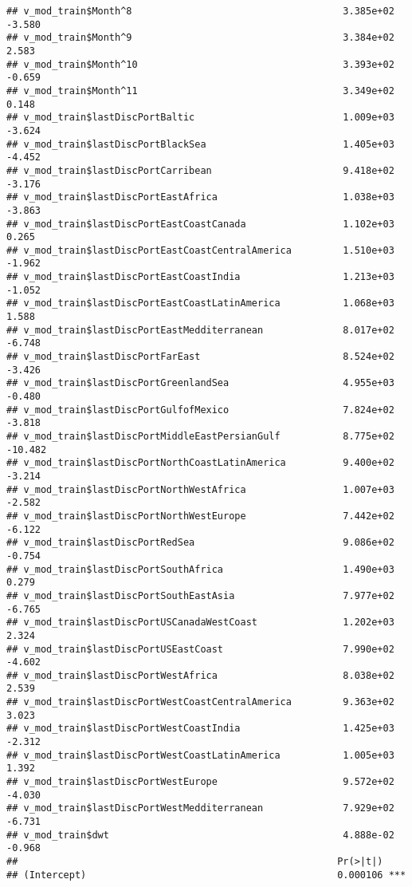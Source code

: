 \documentclass[]{article}
\begin{document}
\begin{verbatim}
## v_mod_train$Month^8                                     3.385e+02  -3.580
## v_mod_train$Month^9                                     3.384e+02   2.583
## v_mod_train$Month^10                                    3.393e+02  -0.659
## v_mod_train$Month^11                                    3.349e+02   0.148
## v_mod_train$lastDiscPortBaltic                          1.009e+03  -3.624
## v_mod_train$lastDiscPortBlackSea                        1.405e+03  -4.452
## v_mod_train$lastDiscPortCarribean                       9.418e+02  -3.176
## v_mod_train$lastDiscPortEastAfrica                      1.038e+03  -3.863
## v_mod_train$lastDiscPortEastCoastCanada                 1.102e+03   0.265
## v_mod_train$lastDiscPortEastCoastCentralAmerica         1.510e+03  -1.962
## v_mod_train$lastDiscPortEastCoastIndia                  1.213e+03  -1.052
## v_mod_train$lastDiscPortEastCoastLatinAmerica           1.068e+03   1.588
## v_mod_train$lastDiscPortEastMedditerranean              8.017e+02  -6.748
## v_mod_train$lastDiscPortFarEast                         8.524e+02  -3.426
## v_mod_train$lastDiscPortGreenlandSea                    4.955e+03  -0.480
## v_mod_train$lastDiscPortGulfofMexico                    7.824e+02  -3.818
## v_mod_train$lastDiscPortMiddleEastPersianGulf           8.775e+02 -10.482
## v_mod_train$lastDiscPortNorthCoastLatinAmerica          9.400e+02  -3.214
## v_mod_train$lastDiscPortNorthWestAfrica                 1.007e+03  -2.582
## v_mod_train$lastDiscPortNorthWestEurope                 7.442e+02  -6.122
## v_mod_train$lastDiscPortRedSea                          9.086e+02  -0.754
## v_mod_train$lastDiscPortSouthAfrica                     1.490e+03   0.279
## v_mod_train$lastDiscPortSouthEastAsia                   7.977e+02  -6.765
## v_mod_train$lastDiscPortUSCanadaWestCoast               1.202e+03   2.324
## v_mod_train$lastDiscPortUSEastCoast                     7.990e+02  -4.602
## v_mod_train$lastDiscPortWestAfrica                      8.038e+02   2.539
## v_mod_train$lastDiscPortWestCoastCentralAmerica         9.363e+02   3.023
## v_mod_train$lastDiscPortWestCoastIndia                  1.425e+03  -2.312
## v_mod_train$lastDiscPortWestCoastLatinAmerica           1.005e+03   1.392
## v_mod_train$lastDiscPortWestEurope                      9.572e+02  -4.030
## v_mod_train$lastDiscPortWestMedditerranean              7.929e+02  -6.731
## v_mod_train$dwt                                         4.888e-02  -0.968
##                                                        Pr(>|t|)    
## (Intercept)                                            0.000106 ***

\end{verbatim}
\end{document}
